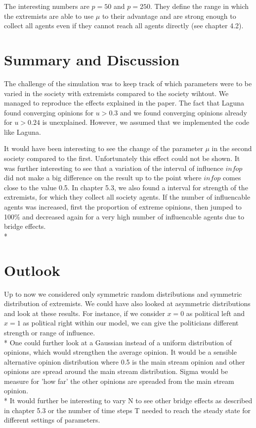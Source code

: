 \documentclass[11pt]{article}
\begin{document}
The interesting numbers are $p = 50$ and $p = 250$. They define the range in which the extremists are able to use $\mu$ to their advantage and are strong enough to collect all agents even if they cannot reach all agents directly (see chapter 4.2).


\section{Summary and Discussion}
The challenge of the simulation was to keep track of which parameters were to be varied in the society with extremists compared to the society wihtout. We managed to reproduce the effects explained in the paper. The fact that Laguna found converging opinions for $u>0.3$ and we found converging opinions already for $u>0.24$ is unexplained. However, we assumed that we implemented the code like Laguna.

It would have been interesting to see the change of the parameter $\mu$ in the second society compared to the first. Unfortunately this effect could not be shown. It was further interesting to see that a variation of the interval of influence $infop$ did not make a big difference on the result up to the point where $infop$ comes close to the value 0.5. In chapter 5.3, we also found a interval for strength of the extremists, for which they collect all society agents. If the number of influencable agents was increased, first the proportion of extreme opinions, then jumped to 100$\%$ and decreased again for a very high number of influencable agents due to bridge effects.\\*


\section{Outlook}
Up to now we considered only symmetric random distributions and symmetric distribution of extremists. We could have also looked at asymmetric distributions and look at these results. For instance, if we consider $x=0$ as political left and $x=1$ as political right within our model, we can give the politicians different strength or range of influence. \\*
One could further look at a Gaussian instead of a uniform distribution of opinions, which would strengthen the average opinion. It would be a  sensible alternative opinion distribution where 0.5 is the main stream opinion and other opinions are spread around the main stream distribution. Sigma would be measure for 'how far' the other opinions are spreaded from the main stream opinion. \\*
It would further be interesting to vary N to see other bridge effects as described in chapter 5.3 or the number of time steps T needed to reach the steady state for different settings of parameters.
\end{document}
